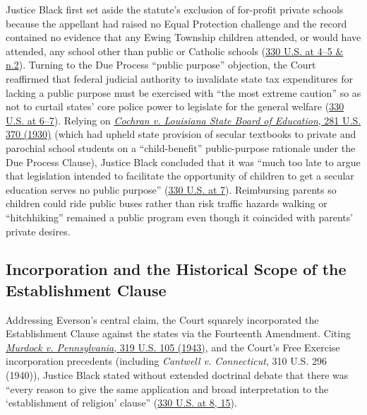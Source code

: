 \documentclass[12pt]{article}
\begin{document}
Justice Black first set aside the statute's exclusion of for-profit private schools because the appellant had raised no Equal Protection challenge and the record contained no evidence that any Ewing Township children attended, or would have attended, any school other than public or Catholic schools (\href{https://supreme.justia.com/cases/federal/us/330/1/}{330 U.S. at 4--5 \& n.2}). Turning to the Due Process ``public purpose'' objection, the Court reaffirmed that federal judicial authority to invalidate state tax expenditures for lacking a public purpose must be exercised with ``the most extreme caution'' so as not to curtail states' core police power to legislate for the general welfare (\href{https://supreme.justia.com/cases/federal/us/330/1/}{330 U.S. at 6--7}). Relying on \href{https://supreme.justia.com/cases/federal/us/281/370/}{\emph{Cochran v. Louisiana State Board of Education}, 281 U.S. 370 (1930)} (which had upheld state provision of secular textbooks to private and parochial school students on a ``child-benefit'' public-purpose rationale under the Due Process Clause), Justice Black concluded that it was ``much too late to argue that legislation intended to facilitate the opportunity of children to get a secular education serves no public purpose'' (\href{https://supreme.justia.com/cases/federal/us/330/1/}{330 U.S. at 7}). Reimbursing parents so children could ride public buses rather than risk traffic hazards walking or ``hitchhiking'' remained a public program even though it coincided with parents' private desires.

\subsection{Incorporation and the Historical Scope of the Establishment Clause}

Addressing Everson's central claim, the Court squarely incorporated the Establishment Clause against the states via the Fourteenth Amendment. Citing \href{https://supreme.justia.com/cases/federal/us/319/105/}{\emph{Murdock v. Pennsylvania}, 319 U.S. 105 (1943)}, and the Court's Free Exercise incorporation precedents (including \emph{Cantwell v. Connecticut}, 310 U.S. 296 (1940)), Justice Black stated without extended doctrinal debate that there was ``every reason to give the same application and broad interpretation to the `establishment of religion' clause'' (\href{https://supreme.justia.com/cases/federal/us/330/1/}{330 U.S. at 8, 15}).
\end{document}
